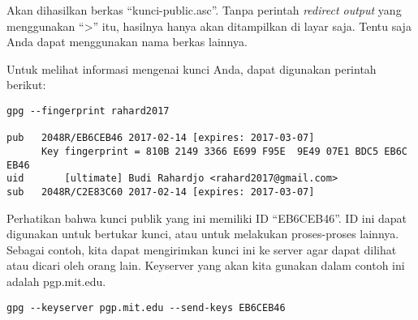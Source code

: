 Akan dihasilkan berkas ``kunci-public.asc''. Tanpa perintah {\em redirect
output} yang menggunakan ``>'' itu, hasilnya hanya akan ditampilkan di layar
saja. Tentu saja Anda dapat menggunakan nama berkas lainnya.

Untuk melihat informasi mengenai kunci Anda, dapat digunakan perintah berikut:

\begin{verbatim}
gpg --fingerprint rahard2017

pub   2048R/EB6CEB46 2017-02-14 [expires: 2017-03-07]
      Key fingerprint = 810B 2149 3366 E699 F95E  9E49 07E1 BDC5 EB6C EB46
uid       [ultimate] Budi Rahardjo <rahard2017@gmail.com>
sub   2048R/C2E83C60 2017-02-14 [expires: 2017-03-07]
\end{verbatim}

Perhatikan bahwa kunci publik yang ini memiliki ID ``EB6CEB46''. ID ini dapat
digunakan untuk bertukar kunci, atau untuk melakukan proses-proses lainnya.
Sebagai contoh, kita dapat mengirimkan kunci ini ke server agar dapat dilihat
atau dicari oleh orang lain. Keyserver yang akan kita gunakan dalam contoh ini
adalah pgp.mit.edu.

\begin{verbatim}
gpg --keyserver pgp.mit.edu --send-keys EB6CEB46
\end{verbatim}

